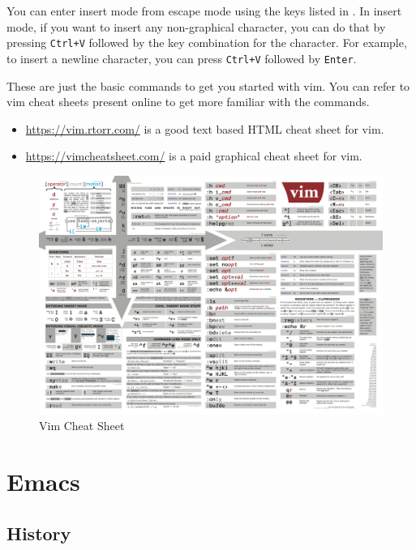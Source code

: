 You can enter insert mode from escape mode using the
keys listed in .
In insert mode, if you want to insert any non-graphical character,
you can do that by pressing \texttt{Ctrl+V} followed by the
key combination for the character. For example, to insert
a newline character, you can press \texttt{Ctrl+V} followed
by \texttt{Enter}.

These are just the basic commands to get you started with vim.
You can refer to vim cheat sheets present online to get
more familiar with the commands.

\begin{itemize}
  \item \url{https://vim.rtorr.com/} is a good text based HTML cheat sheet for vim.
  \item \url{https://vimcheatsheet.com/} is a paid graphical cheat sheet for vim.
\end{itemize}

\begin{figure}[p]
  \includegraphics{images/png/vimcheat.png}
  \caption{Vim Cheat Sheet}
\end{figure}

\vfill
\pagebreak
\section{Emacs}

\subsection{History}

